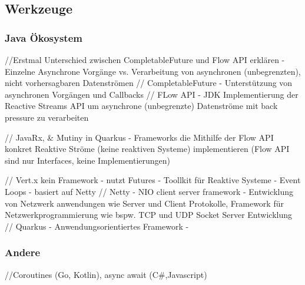 \subsection{Werkzeuge}

\subsubsection{Java Ökosystem}
//Erstmal Unterschied zwischen CompletableFuture und Flow API erklären - Einzelne Asynchrone Vorgänge vs. Verarbeitung von asynchronen (unbegrenzten), nicht
vorhersagbaren Datenströmen
// CompletableFuture - Unterstützung von asynchronen Vorgängen und Callbacks
// FLow API - JDK Implementierung der Reactive Streams API um asynchrone (unbegrenzte) Datenströme mit back pressure zu verarbeiten


// JavaRx,  \& Mutiny in Quarkus - Frameworks die Mithilfe der Flow API konkret Reaktive Ströme (keine reaktiven Systeme)
implementieren (Flow API sind nur Interfaces, keine Implementierungen)

// Vert.x kein Framework - nutzt Futures  - Toollkit für Reaktive Systeme - Event Loops - basiert auf Netty
// Netty - NIO client server framework  - Entwicklung von Netzwerk anwendungen wie Server und Client Protokolle, Framework für Netzwerkprogrammierung
wie bspw. TCP und UDP Socket Server Entwicklung
// Quarkus - Anwendungsorientiertes Framework -
\parencite{OracleFlow}
\parencite{OracleFuture}
\parencite{ReactiveX}
\parencite{Mutiny}

\parencite{Vert.x}
\parencite{Netty}

\parencite{Quarkus}
\subsubsection{Andere}
//Coroutines (Go, Kotlin), async await (C\#,Javascript)
\parencite{KotlinCoroutines}
\parencite{JavascriptAsync}